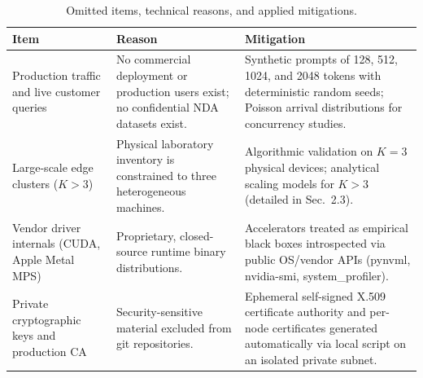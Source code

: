 \documentclass[10pt,a4paper]{article}
\newcommand{\code}[1]{{\ttfamily\footnotesize #1}}
\begin{document}
\begin{table}[H]
\centering\footnotesize
\caption{Omitted items, technical reasons, and applied mitigations.}
\begin{tabularx}{\textwidth}{@{}p{3.2cm} Y Y@{}}
\toprule
Item & Reason & Mitigation\\
\midrule
Production traffic and live customer queries & No commercial deployment or production users exist; no confidential NDA datasets exist. & Synthetic prompts of 128, 512, 1024, and 2048 tokens with deterministic random seeds; Poisson arrival distributions for concurrency studies.\\
Large-scale edge clusters ($K>3$) & Physical laboratory inventory is constrained to three heterogeneous machines. & Algorithmic validation on $K=3$ physical devices; analytical scaling models for $K>3$ (detailed in Sec.~2.3).\\
Vendor driver internals (CUDA, Apple Metal MPS) & Proprietary, closed-source runtime binary distributions. & Accelerators treated as empirical black boxes introspected via public OS/vendor APIs (\code{pynvml}, \code{nvidia-smi}, \code{system\_profiler}).\\
Private cryptographic keys and production CA & Security-sensitive material excluded from git repositories. & Ephemeral self-signed X.509 certificate authority and per-node certificates generated automatically via local script on an isolated private subnet.\\
\bottomrule
\end{tabularx}
\end{table}
\end{document}

